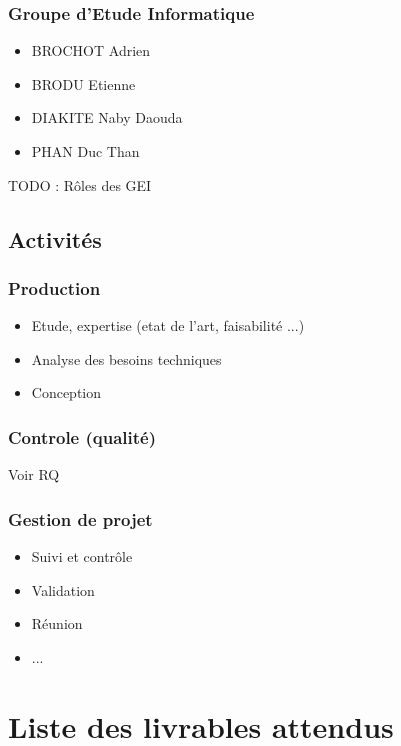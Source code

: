 \subsubsection{Groupe d'Etude Informatique}
\begin{itemize}
\item BROCHOT Adrien
\item BRODU Etienne
\item DIAKITE Naby Daouda 
\item PHAN Duc Than
\end{itemize}
TODO : Rôles des GEI

\subsection{Activités}
\subsubsection{Production}
\begin{itemize}
\item Etude, expertise (etat de l'art, faisabilité ...)
\item Analyse des besoins techniques
\item Conception
\end{itemize}
\subsubsection{Controle (qualité)}
Voir RQ
\subsubsection{Gestion de projet}
\begin{itemize}
\item Suivi et contrôle
\item Validation
\item Réunion
\item ...
\end{itemize}
\section{Liste des livrables attendus}
